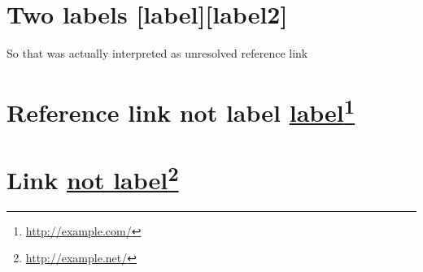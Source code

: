 \section{Two labels [label][label2]}
\label{}

So that was actually interpreted as unresolved reference link

\section{Reference link not label \href{http://example.com/}{label}\footnote{\href{http://example.com/}{http:\slash \slash example.com\slash }}}
\label{referencelinknotlabellabel}

\section{Link \href{http://example.net/}{not label}\footnote{\href{http://example.net/}{http:\slash \slash example.net\slash }}}
\label{linknotlabel}




